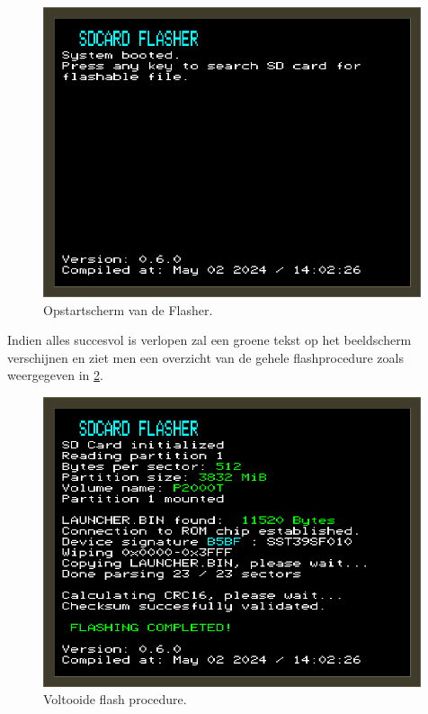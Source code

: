 \begin{figure}[h!]
    \centering
    \includegraphics[width=0.99\textwidth]{img/flasher_boot.png}
    \caption{Opstartscherm van de Flasher.}
    \label{fig:flasher-boot}
\end{figure}

Indien alles succesvol is verlopen zal een groene tekst op het beeldscherm verschijnen en ziet men een overzicht van de gehele flashprocedure zoals weergegeven in \cref{fig:flasher-done}.

\newpage

\begin{figure}[h!]
    \centering
    \includegraphics[width=0.99\textwidth]{img/flasher_done.png}
    \caption{Voltooide flash procedure.}
    \label{fig:flasher-done}
\end{figure}

